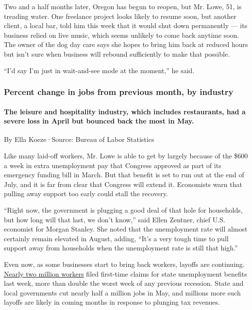 Two and a half months later, Oregon has begun to reopen, but Mr. Lowe,
51, is treading water. One freelance project looks likely to resume
soon, but another client, a local bar, told him this week that it would
shut down permanently --- its business relied on live music, which seems
unlikely to come back anytime soon. The owner of the dog day care says
she hopes to bring him back at reduced hours but isn't sure when
business will rebound sufficiently to make that possible.

``I'd say I'm just in wait-and-see mode at the moment,'' he said.

\hypertarget{percent-change-in-jobs-from-previous-month-by-industry}{%
\subsubsection{Percent change in jobs from previous month, by
industry}\label{percent-change-in-jobs-from-previous-month-by-industry}}

\hypertarget{the-leisure-and-hospitality-industry-which-includes-restaurants-had-a-severe-loss-in-april-but-bounced-back-the-most-in-may}{%
\paragraph{The leisure and hospitality industry, which includes
restaurants, had a severe loss in April but bounced back the most in
May.}\label{the-leisure-and-hospitality-industry-which-includes-restaurants-had-a-severe-loss-in-april-but-bounced-back-the-most-in-may}}

By Ella Koeze·Source: Bureau of Labor Statistics

Like many laid-off workers, Mr. Lowe is able to get by largely because
of the \$600 a week in extra unemployment pay that Congress approved as
part of its emergency funding bill in March. But that benefit is set to
run out at the end of July, and it is far from clear that Congress will
extend it. Economists warn that pulling away support too early could
stall the recovery.

``Right now, the government is plugging a good deal of that hole for
households, but how long will that last, we don't know,'' said Ellen
Zentner, chief U.S. economist for Morgan Stanley. She noted that the
unemployment rate will almost certainly remain elevated in August,
adding, ``It's a very tough time to pull support away from households
when the unemployment rate is still that high.''

Even now, as some businesses start to bring back workers, layoffs are
continuing.
\href{https://www.nytimes3xbfgragh.onion/2020/06/04/business/economy/coronavirus-unemployment-claims.html}{Nearly
two million workers} filed first-time claims for state unemployment
benefits last week, more than double the worst week of any previous
recession. State and local governments cut nearly half a million jobs in
May, and millions more such layoffs are likely in coming months in
response to plunging tax revenues.

